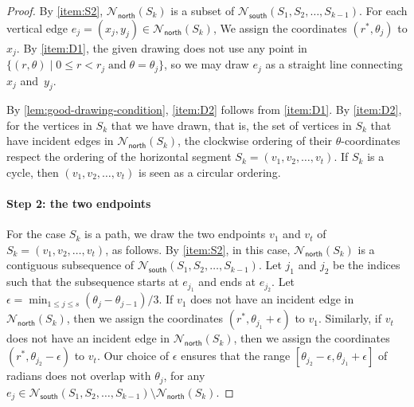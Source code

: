 \documentclass{article}\usepackage[a4paper,margin=20mm]{geometry}
\newcommand{\Nnorth}{\mathcal{N}_\mathsf{north}}
\newcommand{\Nsouth}{\mathcal{N}_\mathsf{south}}
\begin{document}
\begin{proof}
By \ref{item:S2}, $\Nnorth(S_k)$ is a subset of $\Nsouth(S_1, S_2, \ldots, S_{k-1})$. 
For each vertical edge $e_j = (x_j,y_j) \in \Nnorth(S_k)$, We assign the coordinates $(r^\ast, \theta_j)$ to $x_j$. By \ref{item:D1}, the given drawing does not use any point in $\{ (r,\theta) \mid 0\leq r < r_j \; \text{and} \; \theta = \theta_j\}$, so we may draw $e_j$ as a straight line connecting $x_j$ and~$y_j$. 


By \cref{lem:good-drawing-condition}, \ref{item:D2} follows from \ref{item:D1}. By \ref{item:D2}, for the vertices in $S_k$ that we have drawn, that is, the set of vertices in $S_k$ that have incident edges in $\Nnorth(S_k)$, the clockwise ordering of their $\theta$-coordinates respect the ordering of the horizontal segment $S_k = (v_1, v_2, \ldots, v_t)$. If $S_k$ is a cycle, then $(v_1, v_2, \ldots, v_t)$ is seen as a circular ordering.

\paragraph{Step 2: the two endpoints} For the case $S_k$ is a path, we draw the two endpoints $v_1$ and $v_t$ of $S_k = (v_1, v_2, \ldots, v_t)$, as follows. By \ref{item:S2}, in this case, $\Nnorth(S_k)$ is a contiguous subsequence of $\Nsouth(S_1, S_2, \ldots, S_{k-1})$. Let $j_1$ and $j_2$ be the indices such that the subsequence starts at $e_{j_1}$ and ends at $e_{j_2}$. Let $\epsilon = \min_{1 \leq j \leq s} (\theta_j - \theta_{j-1})/3$.
If $v_1$ does not have an incident edge in $\Nnorth(S_k)$, then we assign the coordinates $\left(r^\ast, \theta_{j_1}+\epsilon \right)$ to $v_1$.
Similarly, if $v_t$ does not have an incident edge in $\Nnorth(S_k)$, then we assign the coordinates $\left(r^\ast, \theta_{j_2}-\epsilon \right)$ to $v_t$.
Our choice of $\epsilon$ ensures that the range $[\theta_{j_2}-\epsilon, \theta_{j_1}+\epsilon]$ of radians does not overlap with  $\theta_j$, for any $e_j \in \Nsouth(S_1, S_2, \ldots, S_{k-1}) \setminus \Nnorth(S_k)$.


\end{proof}
\end{document}
